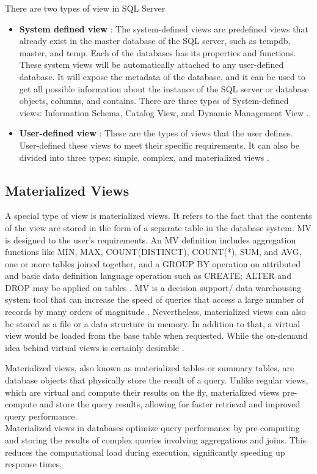 There are two types of view in SQL Server
\begin{itemize}
    \item \textbf{System defined view }: The system-defined views are predefined views that already exist in the master database of the SQL server, such as tempdb, master, and temp. Each of the databases has its properties and functions. These system views will be automatically attached to any user-defined database. It will expose the metadata of the database, and it can be used to get all possible information about the instance of the SQL server or database objects, columns, and contains. There are three types of System-defined views: Information Schema, Catalog View, and Dynamic Management View \cite{chauhan-2024}.
    \item \textbf{User-defined view }: These are the types of views that the user defines. User-defined these views to meet their specific requirements. It can also be divided into three types: simple, complex, and materialized views \cite{javapoint-author-2024}.
\end{itemize}
   
\subsection{Materialized Views}
 A special type of view is materialized views. It refers to the fact that the contents of the view are stored in the form of a separate table in the database system. MV is designed to the user's requirements. An MV definition includes aggregation functions like MIN, MAX, COUNT(DISTINCT), COUNT(*), SUM, and AVG, one or more tables joined together, and a GROUP BY operation on attributed and basic data definition language operation such as CREATE; ALTER and DROP may be applied on tables \cite{Kardel_Thakare}. MV is a decision support/ data warehousing system tool that can increase the speed of queries that access a large number of records by many orders of magnitude \cite{Kishan_Sainath_no_date}. Nevertheless, materialized views can also be stored as a file or a data structure in memory. In addition to that, a virtual view would be loaded from the base table when requested. While the on-demand idea behind virtual views is certainly desirable \cite{jan-no-date,ashadevi-2024}.

\begin{definition}
Materialized views, also known as materialized tables or summary tables, are database objects that physically store the result of a query. Unlike regular views, which are virtual and compute their results on the fly, materialized views pre-compute and store the query results, allowing for faster retrieval and improved query performance.\\
Materialized views in databases optimize query performance by pre-computing and storing the results of complex queries involving aggregations and joins. This reduces the computational load during execution, significantly speeding up response times.

\end{definition}

